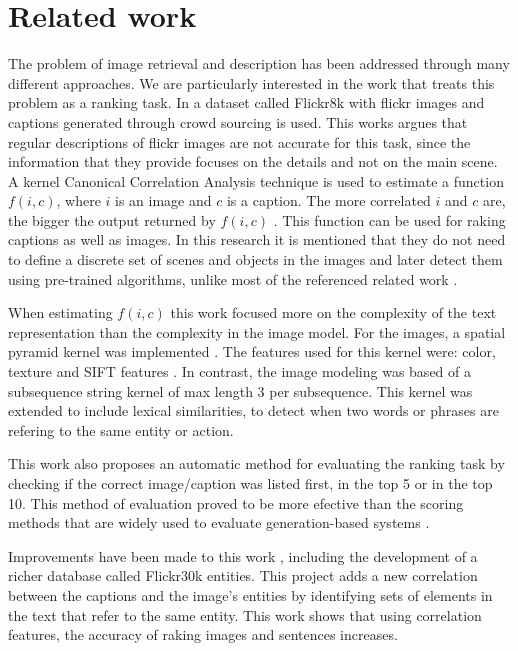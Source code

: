 \documentclass[11pt]{article}
\begin{document}
\section{Related work}
The problem of image retrieval and description has been addressed through many different approaches.
We are particularly interested in the work that treats this problem as a ranking task. In \cite{DBLP:conf/ijcai/HodoshYH15}  a dataset called Flickr8k with flickr images and captions generated through crowd sourcing is used. This works argues that regular descriptions of flickr images are not accurate for this task, since the information that they provide  focuses on the details and not on the main scene. A kernel Canonical Correlation Analysis technique is used to estimate a function $f(i,c)$, where $i$ is an image and $c$ is a caption. The more correlated $i$ and $c$ are, the bigger the output returned by $f(i,c)$  \cite{Hodosh:2013:FID:2566972.2566993}. This function can be used for raking captions as well as images. In this research it is mentioned that they do not need to define a discrete set of scenes and objects in the images and later detect them using pre-trained algorithms, unlike most of the referenced related work \cite{6522402} \cite{Mitchell:2012:MGI:2380816.2380907} \cite{Yang:2011:CSG:2145432.2145484}.

When estimating $f(i,c)$ this work focused more on the complexity of the text representation than the complexity in the image model. For the images, a spatial pyramid kernel was implemented \cite{Lazebnik:2006:BBF:1153171.1153549} . The features used for this kernel were: color, texture and SIFT features \cite{Lowe04distinctiveimage}. In contrast, the image modeling was based of a subsequence string kernel of max length 3 per subsequence\cite{Hodosh:2013:FID:2566972.2566993}. This kernel was extended to include lexical similarities, to detect when two words or phrases are refering to the same entity or action. 

This work also proposes an automatic method for evaluating the ranking task by checking if the correct image/caption was listed first, in the top 5 or in the top 10. This method of evaluation proved to be more efective than the scoring methods that are widely used to evaluate generation-based systems \cite{Papineni:2002:BMA:1073083.1073135}  \cite{Lin04rouge:a}.
 
Improvements have been made to this work \cite{DBLP:journals/corr/PlummerWCCHL15}, including the development of a richer database called Flickr30k entities. This project adds a new correlation between the captions and the image's entities by identifying sets of elements in the text that refer to the same entity. This work shows that using correlation features, the accuracy of raking images and sentences  increases. 
\end{document}
